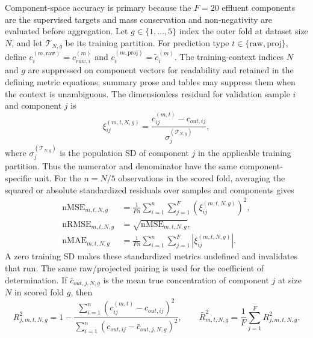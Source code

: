 \documentclass[a4paper,fleqn]{cas-sc}
\begin{document}
Component-space accuracy is primary because the $F=20$ effluent components are the supervised targets and mass conservation and non-negativity are evaluated before aggregation. Let $g\in\{1,\ldots,5\}$ index the outer fold at dataset size $N$, and let $\mathcal{T}_{N,g}$ be its training partition. For prediction type $t\in\{\mathrm{raw},\mathrm{proj}\}$, define $c_i^{(m,\mathrm{raw})}=c_{raw,i}^{(m)}$ and $c_i^{(m,\mathrm{proj})}=\tilde c_i^{(m)}$. The training-context indices $N$ and $g$ are suppressed on component vectors for readability and retained in the defining metric equations; summary prose and tables may suppress them when the context is unambiguous. The dimensionless residual for validation sample $i$ and component $j$ is
\begin{equation}
\label{eq:standardized_residual}
\xi_{ij}^{(m,t,N,g)}
=\frac{c_{ij}^{(m,t)}-c_{out,ij}}
{\sigma_j^{(\mathcal{T}_{N,g})}},
\end{equation}
where $\sigma_j^{(\mathcal{T}_{N,g})}$ is the population SD of component $j$ in the applicable training partition. Thus the numerator and denominator have the same component-specific unit. For the $n=N/5$ observations in the scored fold, averaging the squared or absolute standardized residuals over samples and components gives
\begin{align}
\mathrm{nMSE}_{m,t,N,g}
&=\frac{1}{Fn}\sum_{i=1}^{n}\sum_{j=1}^{F}
\left(\xi_{ij}^{(m,t,N,g)}\right)^2, \nonumber\\
\mathrm{nRMSE}_{m,t,N,g}
&=\sqrt{\mathrm{nMSE}_{m,t,N,g}}, \label{eq:normalized_metrics}\\
\mathrm{nMAE}_{m,t,N,g}
&=\frac{1}{Fn}\sum_{i=1}^{n}\sum_{j=1}^{F}
\left|\xi_{ij}^{(m,t,N,g)}\right|. \nonumber
\end{align}
A zero training SD makes these standardized metrics undefined and invalidates that run. The same raw/projected pairing is used for the coefficient of determination. If $\bar c_{out,j,N,g}$ is the mean true concentration of component $j$ at size $N$ in scored fold $g$, then
\begin{equation}
R_{j,m,t,N,g}^{2}
=1-\frac{\sum_{i=1}^{n}\left(c_{ij}^{(m,t)}-c_{out,ij}\right)^2}
{\sum_{i=1}^{n}\left(c_{out,ij}-\bar c_{out,j,N,g}\right)^2},
\qquad
\bar R_{m,t,N,g}^{2}=\frac{1}{F}\sum_{j=1}^{F}R_{j,m,t,N,g}^{2}.
\label{eq:coefficient_determination}
\end{equation}
\end{document}
